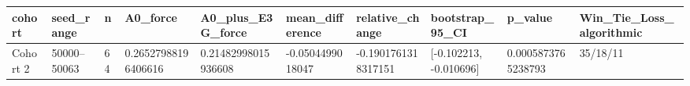 \begin{tabular}{llllllllll}
\toprule
cohort & seed\_range & n & A0\_force & A0\_plus\_E3G\_force & mean\_difference & relative\_change & bootstrap\_95\_CI & p\_value & Win\_Tie\_Loss\_algorithmic \\
\midrule
Cohort 2 & 50000–50063 & 64 & 0.26527988196406616 & 0.21482998015936608 & -0.0504499018047 & -0.1901761318317151 & [-0.102213, -0.010696] & 0.0005873765238793 & 35/18/11 \\
\bottomrule
\end{tabular}
